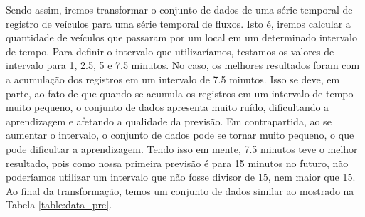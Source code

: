 Sendo assim, iremos transformar o conjunto de dados de uma série temporal de registro de veículos para uma série temporal de fluxos. Isto é, iremos calcular a quantidade de veículos que passaram por um local em um determinado intervalo de tempo. Para definir o intervalo que utilizaríamos, testamos os valores de intervalo para 1, 2.5, 5 e 7.5 minutos. No caso, os melhores resultados foram com a acumulação dos registros em um intervalo de 7.5 minutos. Isso se deve, em parte, ao fato de que quando se acumula os registros em um intervalo de tempo muito pequeno, o conjunto de dados apresenta muito ruído, dificultando a aprendizagem e afetando a qualidade da previsão. Em contrapartida, ao se aumentar o intervalo, o conjunto de dados pode se tornar muito pequeno, o que pode dificultar a aprendizagem. Tendo isso em mente, 7.5 minutos teve o melhor resultado, pois como nossa primeira previsão é para 15 minutos no futuro, não poderíamos utilizar um intervalo que não fosse divisor de 15, nem maior que 15. Ao final da transformação, temos um conjunto de dados similar ao mostrado na Tabela \ref{table:data_pre}.

